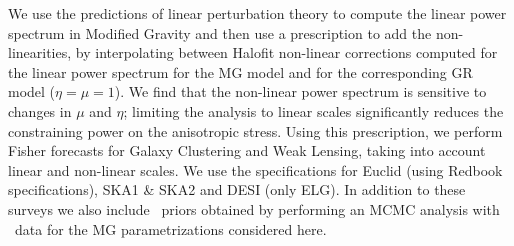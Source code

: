 

We use the predictions of linear perturbation theory to compute the linear power spectrum in Modified Gravity and then
use a prescription to add the non-linearities, by interpolating between Halofit non-linear corrections computed for the linear power spectrum for the MG model and for the corresponding GR model ($\eta=\mu=1$). We find that the non-linear power spectrum is sensitive to 
changes in $\mu$ and $\eta$; limiting the analysis to linear scales significantly reduces the constraining power on the anisotropic stress.
Using this prescription, we perform Fisher forecasts for Galaxy Clustering and Weak Lensing, taking into account linear and non-linear scales. 
We use the specifications for Euclid (using Redbook specifications), SKA1 \& SKA2 and DESI (only ELG). In addition to these surveys we also include
\planck\ priors obtained by performing an MCMC analysis with \planck\ data for the MG parametrizations considered here.

